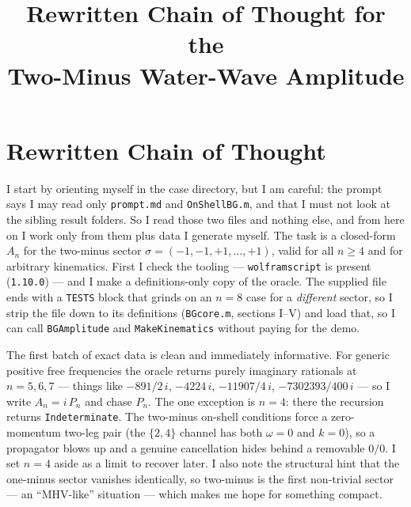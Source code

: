 \documentclass{article}
\title{Rewritten Chain of Thought for the\\
Two-Minus Water-Wave Amplitude}
\author{}
\date{}
\begin{document}
\maketitle


\section*{Rewritten Chain of Thought}

I start by orienting myself in the case directory, but I am careful: the prompt
says I may read only \texttt{prompt.md} and \texttt{OnShellBG.m}, and that I must
not look at the sibling result folders. So I read those two files and nothing
else, and from here on I work only from them plus data I generate myself. The
task is a closed-form $A_n$ for the two-minus sector
$\sigma=(-1,-1,+1,\dots,+1)$, valid for all $n\ge4$ and for arbitrary kinematics.
First I check the tooling --- \texttt{wolframscript} is present
(\texttt{1.10.0}) --- and I make a definitions-only copy of the oracle. The
supplied file ends with a \texttt{TESTS} block that grinds on an $n=8$ case for a
\emph{different} sector, so I strip the file down to its definitions
(\texttt{BGcore.m}, sections I--V) and load that, so I can call
\texttt{BGAmplitude} and \texttt{MakeKinematics} without paying for the demo.

The first batch of exact data is clean and immediately informative. For generic
positive free frequencies the oracle returns purely imaginary rationals at
$n=5,6,7$ --- things like $-891/2\,i$, $-4224\,i$, $-11907/4\,i$,
$-7302393/400\,i$ --- so I write $A_n=i\,P_n$ and chase $P_n$. The one exception
is $n=4$: there the recursion returns \texttt{Indeterminate}. The two-minus
on-shell conditions force a zero-momentum two-leg pair (the $\{2,4\}$ channel has
both $\omega=0$ and $k=0$), so a propagator blows up and a genuine cancellation
hides behind a removable $0/0$. I set $n=4$ aside as a limit to recover later.
I also note the structural hint that the one-minus sector vanishes identically, so
two-minus is the first non-trivial sector --- an ``MHV-like'' situation --- which
makes me hope for something compact.
\end{document}
